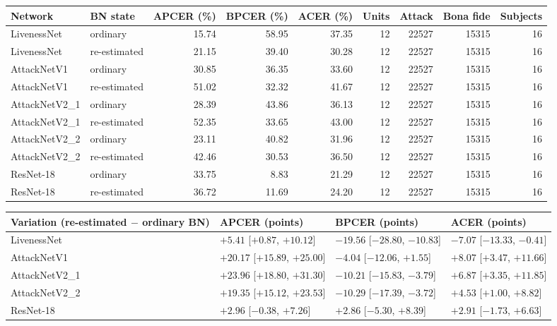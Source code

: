 \begin{tabular}{llrrrrrrr}
\hline
Network & BN state & APCER (\%) & BPCER (\%) & ACER (\%) & Units & Attack & Bona fide & Subjects \\
\hline
LivenessNet & ordinary & 15.74 & 58.95 & 37.35 & 12 & 22527 & 15315 & 16 \\
LivenessNet & re-estimated & 21.15 & 39.40 & 30.28 & 12 & 22527 & 15315 & 16 \\
AttackNetV1 & ordinary & 30.85 & 36.35 & 33.60 & 12 & 22527 & 15315 & 16 \\
AttackNetV1 & re-estimated & 51.02 & 32.32 & 41.67 & 12 & 22527 & 15315 & 16 \\
AttackNetV2\_1 & ordinary & 28.39 & 43.86 & 36.13 & 12 & 22527 & 15315 & 16 \\
AttackNetV2\_1 & re-estimated & 52.35 & 33.65 & 43.00 & 12 & 22527 & 15315 & 16 \\
AttackNetV2\_2 & ordinary & 23.11 & 40.82 & 31.96 & 12 & 22527 & 15315 & 16 \\
AttackNetV2\_2 & re-estimated & 42.46 & 30.53 & 36.50 & 12 & 22527 & 15315 & 16 \\
ResNet-18 & ordinary & 33.75 & 8.83 & 21.29 & 12 & 22527 & 15315 & 16 \\
ResNet-18 & re-estimated & 36.72 & 11.69 & 24.20 & 12 & 22527 & 15315 & 16 \\
\hline
\end{tabular}

\begin{tabular}{llll}
\hline
Variation (re-estimated $-$ ordinary BN) & APCER (points) & BPCER (points) & ACER (points) \\
\hline
LivenessNet & $+5.41$ [$+0.87$, $+10.12$] & $-19.56$ [$-28.80$, $-10.83$] & $-7.07$ [$-13.33$, $-0.41$] \\
AttackNetV1 & $+20.17$ [$+15.89$, $+25.00$] & $-4.04$ [$-12.06$, $+1.55$] & $+8.07$ [$+3.47$, $+11.66$] \\
AttackNetV2\_1 & $+23.96$ [$+18.80$, $+31.30$] & $-10.21$ [$-15.83$, $-3.79$] & $+6.87$ [$+3.35$, $+11.85$] \\
AttackNetV2\_2 & $+19.35$ [$+15.12$, $+23.53$] & $-10.29$ [$-17.39$, $-3.72$] & $+4.53$ [$+1.00$, $+8.82$] \\
ResNet-18 & $+2.96$ [$-0.38$, $+7.26$] & $+2.86$ [$-5.30$, $+8.39$] & $+2.91$ [$-1.73$, $+6.63$] \\
\hline
\end{tabular}

